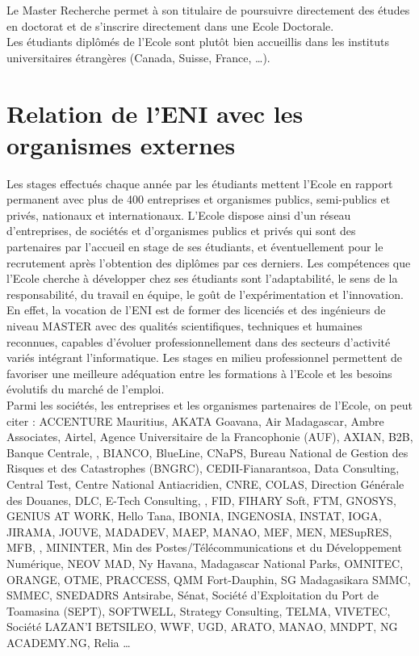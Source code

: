 \documentclass[12pt]{report}
\begin{document}
				Le Master Recherche permet à son titulaire de poursuivre directement des études en doctorat et de s’inscrire directement dans une Ecole Doctorale.\\

				Les étudiants diplômés de l’Ecole sont plutôt bien accueillis dans les instituts universitaires étrangères (Canada, Suisse, France, …).

				\section{Relation de l’ENI avec les organismes externes}
				
				\hspace{15pt} Les stages effectués chaque année par les étudiants mettent l’Ecole en rapport permanent avec plus de 400 entreprises et organismes publics, semi-publics et privés, nationaux et internationaux. L’Ecole dispose ainsi d’un réseau d’entreprises, de sociétés et d’organismes publics et privés qui sont des partenaires par l’accueil en stage de ses étudiants, et éventuellement pour le recrutement après l’obtention des diplômes par ces derniers. Les compétences que l’Ecole cherche à développer chez ses étudiants sont l’adaptabilité, le sens de la responsabilité, du travail en équipe, le goût de l’expérimentation et l’innovation.\\

				En effet, la vocation de l’ENI est de former des licenciés et des ingénieurs de niveau MASTER avec des qualités scientifiques, techniques et humaines reconnues, capables d’évoluer professionnellement dans des secteurs d’activité variés intégrant l’informatique. Les stages en milieu professionnel permettent de favoriser une meilleure adéquation entre les formations à l’Ecole et les besoins évolutifs du marché de l’emploi.\\

				Parmi les sociétés, les entreprises et les organismes partenaires de l’Ecole, on peut citer : ACCENTURE Mauritius, AKATA Goavana, Air Madagascar, Ambre Associates, Airtel, Agence Universitaire de la Francophonie (AUF), AXIAN, B2B, Banque Centrale, , BIANCO, BlueLine, CNaPS, Bureau National de Gestion des Risques et des Catastrophes (BNGRC), CEDII-Fianarantsoa, Data Consulting, Central Test, Centre National Antiacridien, CNRE, COLAS, Direction Générale des Douanes, DLC, E-Tech Consulting, , FID, FIHARY Soft, FTM, GNOSYS, GENIUS AT WORK, Hello Tana, IBONIA, INGENOSIA, INSTAT, IOGA, JIRAMA, JOUVE, MADADEV, MAEP, MANAO, MEF, MEN, MESupRES, MFB, , MININTER, Min des Postes/Télécommunications et du Développement Numérique, NEOV MAD, Ny Havana, Madagascar National Parks, OMNITEC, ORANGE, OTME, PRACCESS, QMM Fort-Dauphin, SG Madagasikara SMMC, SMMEC, SNEDADRS Antsirabe, Sénat, Société d’Exploitation du Port de Toamasina (SEPT), SOFTWELL, Strategy Consulting, TELMA, VIVETEC, Société LAZAN’I BETSILEO, WWF, UGD, ARATO, MANAO, MNDPT, NG ACADEMY.NG, Relia … 			
				
\end{document}
